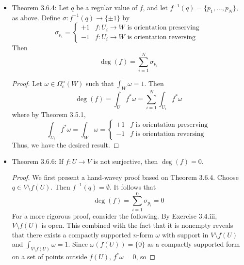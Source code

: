 \documentclass[../notes.tex]{subfiles}
\begin{document}
\begin{itemize}
\begin{proof}
    \end{proof}
    \item Theorem 3.6.4: Let $q$ be a regular value of $f$, and let $f^{-1}(q)=\{p_1,\dots,p_N\}$, as above. Define $\sigma:f^{-1}(q)\to\{\pm 1\}$ by
    \begin{equation*}
        \sigma_{p_i} =
        \begin{cases}
            +1 & f:U_i\to W\text{ is orientation preserving}\\
            -1 & f:U_i\to W\text{ is orientation reversing}
        \end{cases}
    \end{equation*}
    Then
    \begin{equation*}
        \deg(f) = \sum_{i=1}^N\sigma_{p_i}
    \end{equation*}
    \begin{proof}
        Let $\omega\in\Omega_c^n(W)$ such that $\int_W\omega=1$. Then
        \begin{equation*}
            \deg(f) = \int_Uf^*\omega
            = \sum_{i=1}^N\int_{U_i}f^*\omega
        \end{equation*}
        where by Theorem 3.5.1,
        \begin{equation*}
            \int_{U_i}f^*\omega = \int_W\omega =
            \begin{cases}
                +1 & f\text{ is orientation preserving}\\
                -1 & f\text{ is orientation reversing}
            \end{cases}
        \end{equation*}
        Thus, we have the desired result.
    \end{proof}
    \item Theorem 3.6.6: If $f:U\to V$ is not surjective, then $\deg(f)=0$.
    \begin{proof}
        We first present a hand-wavey proof based on Theorem 3.6.4. Choose $q\in V\setminus f(U)$. Then $f^{-1}(q)=\emptyset$. It follows that
        \begin{equation*}
            \deg(f) = \sum_{i=1}^0\sigma_{p_i}
            = 0
        \end{equation*}
        For a more rigorous proof, consider the following. By Exercise 3.4.iii, $V\setminus f(U)$ is open. This combined with the fact that it is nonempty reveals that there exists a compactly supported $n$-form $\omega$ with support in $V\setminus f(U)$ and $\int_{V\setminus f(U)}\omega=1$. Since $\omega(f(U))=\{0\}$ as a compactly supported form on a set of points outside $f(U)$, $f^*\omega=0$, so

\end{proof}
\end{itemize}
\end{document}
